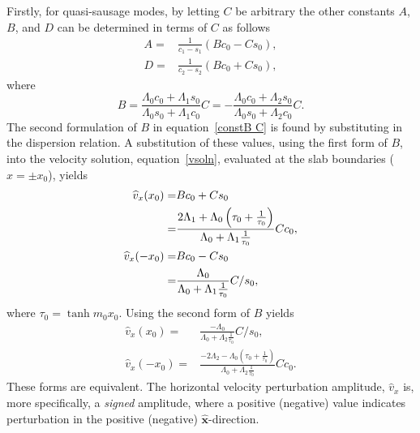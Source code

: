 \documentclass[namedreferences]{solarphysics}
\numberwithin{equation}{section}
\begin{document}
\begin{article}
Firstly, for quasi-sausage modes, by letting $C$ be arbitrary the other constants $A$, $B$, and $D$ can be determined in terms of $C$ as follows
\begin{align}
A=&\frac{1}{c_1-s_1}(Bc_0-Cs_0), \label{constA C} \\ 
D=&\frac{1}{c_2-s_2}(Bc_0+Cs_0), \label{constD C}
\end{align}
where
\begin{equation}
B=\frac{\Lambda_0c_0+\Lambda_1s_0}{\Lambda_0s_0+\Lambda_1c_0}C=-\frac{\Lambda_0c_0+\Lambda_2s_0}{\Lambda_0s_0+\Lambda_2c_0}C. \label{constB C}
\end{equation}
The second formulation of $B$ in equation~\eqref{constB C} is found by substituting in the dispersion relation. A substitution of these values, using the first form of $B$, into the velocity solution, equation~\eqref{vsoln}, evaluated at the slab boundaries ($x=\pm{}x_0$), yields
\begin{align}
\widehat{v}_x(x_0)=&Bc_0+Cs_0 \notag \\
			  =&\frac{2\Lambda_1+\Lambda_0\left(\tau_0+\frac{1}{\tau_0}\right)}{\Lambda_0+\Lambda_1\frac{1}{\tau_0}}Cc_0, \label{vx_01 C} \\
\widehat{v}_x(-x_0)=&Bc_0-Cs_0 \notag \\
			  =&\frac{\Lambda_0}{\Lambda_0+\Lambda_1\frac{1}{\tau_0}}C/s_0, \label{v-x_01 C}
\end{align}
where $\tau_0=\tanh{m_0x_0}$.
Using the second form of $B$ yields
\begin{align}
\widehat{v}_x(x_0)=&\frac{-\Lambda_0}{\Lambda_0+\Lambda_2\frac{1}{\tau_0}}C/s_0, \label{vx_02 C} \\
\widehat{v}_x(-x_0)=&\frac{-2\Lambda_2-\Lambda_0\left(\tau_0+\frac{1}{\tau_0}\right)}{\Lambda_0+\Lambda_2\frac{1}{\tau_0}}Cc_0. \label{v-x_02 C}
\end{align}
These forms are equivalent. The horizontal velocity perturbation amplitude, $\widehat{v}_x$ is, more specifically, a \emph{signed} amplitude, where a positive (negative) value indicates perturbation in the positive (negative) $\mathbf{\widehat{x}}$-direction.


\end{article}
\end{document}
